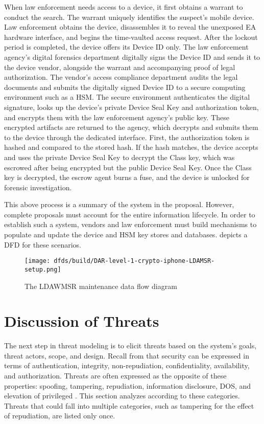 When law enforcement needs access to a device, it first obtains a warrant to conduct the search. The warrant uniquely
identifies the suspect's mobile device. Law enforcement obtains the device, disassembles it to reveal the unexposed
\ac{EA} hardware interface, and begins the time-vaulted access request. After the lockout period is completed, the
device offers its Device ID only. The law enforcement agency's digital forensics department digitally signs the Device
ID and sends it to the device vendor, alongside the warrant and accompanying proof of legal authorization. The vendor's
access compliance department audits the legal documents and submits the digitally signed Device ID to a secure computing
environment such as a \ac{HSM}. The secure environment authenticates the digital signature, looks up the device's
private Device Seal Key and authorization token, and encrypts them with the law enforcement agency's public key. These
encrypted artifacts are returned to the agency, which decrypts and submits them to the device through the dedicated
interface. First, the authorization token is hashed and compared to the stored hash. If the hash matches, the device
accepts and uses the private Device Seal Key to decrypt the Class key, which was escrowed after being encrypted but the
public Device Seal Key. Once the Class key is decrypted, the escrow agent burns a fuse, and the device is unlocked for
forensic investigation.

This above process is a summary of the system in the \ldawmsr proposal. However, complete proposals must account for the
entire information lifecycle. In order to establish such a system, vendors and law enforcement must build mechanisms to
populate and update the device and \ac{HSM} key stores and databases.  depicts a \ac{DFD}
for these scenarios.

\begin{figure}[H]
  \centering\CaptionFontSize
  \texttt{[image: dfds/build/DAR-level-1-crypto-iphone-LDAMSR-setup.png]}
  \caption{The LDAWMSR maintenance data flow diagram}
  \label{fig-dfd-ldawmsr-setup}
\end{figure}


\section{Discussion of Threats}
\label{sec-prop-threats}

The next step in threat modeling is to elicit threats based on the system's goals, threat actors, scope, and design.
Recall from  that security can be expressed in terms of authentication, integrity,
non-repudiation, confidentiality, availability, and authorization. Threats are often expressed as the opposite of these
properties: spoofing, tampering, repudiation, information disclosure, \acl{DOS}, and elevation of privileged
\cite{shostack_threat_2014}. This section analyzes \ldawmsr according to these categories. Threats that could fall into
multiple categories, such as tampering for the effect of repudiation, are listed only once.

